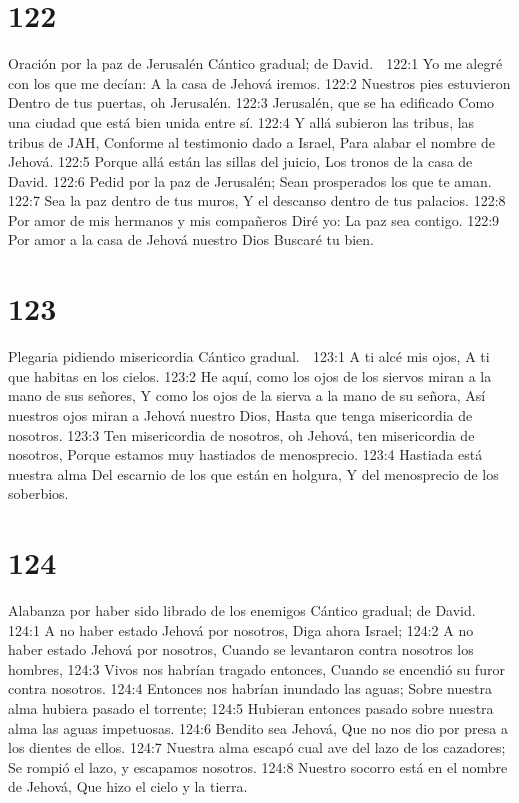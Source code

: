 \chapter{122}

Oración por la paz de Jerusalén 
Cántico gradual; de David. 

122:1 Yo me alegré con los que me decían: 
A la casa de Jehová iremos. 
122:2 Nuestros pies estuvieron 
Dentro de tus puertas, oh Jerusalén. 
122:3 Jerusalén, que se ha edificado 
Como una ciudad que está bien unida entre sí. 
122:4 Y allá subieron las tribus, las tribus de JAH, 
Conforme al testimonio dado a Israel, 
Para alabar el nombre de Jehová. 
122:5 Porque allá están las sillas del juicio, 
Los tronos de la casa de David. 
122:6 Pedid por la paz de Jerusalén; 
Sean prosperados los que te aman. 
122:7 Sea la paz dentro de tus muros, 
Y el descanso dentro de tus palacios. 
122:8 Por amor de mis hermanos y mis compañeros 
Diré yo: La paz sea contigo. 
122:9 Por amor a la casa de Jehová nuestro Dios 
Buscaré tu bien. 

\chapter{123}

Plegaria pidiendo misericordia 
Cántico gradual. 

123:1 A ti alcé mis ojos, 
A ti que habitas en los cielos. 
123:2 He aquí, como los ojos de los siervos miran a la mano de sus señores, 
Y como los ojos de la sierva a la mano de su señora, 
Así nuestros ojos miran a Jehová nuestro Dios, 
Hasta que tenga misericordia de nosotros. 
123:3 Ten misericordia de nosotros, oh Jehová, ten misericordia de nosotros, 
Porque estamos muy hastiados de menosprecio. 
123:4 Hastiada está nuestra alma 
Del escarnio de los que están en holgura, 
Y del menosprecio de los soberbios. 

\chapter{124}

Alabanza por haber sido librado de los enemigos 
Cántico gradual; de David. 

124:1 A no haber estado Jehová por nosotros, 
Diga ahora Israel; 
124:2 A no haber estado Jehová por nosotros, 
Cuando se levantaron contra nosotros los hombres, 
124:3 Vivos nos habrían tragado entonces, 
Cuando se encendió su furor contra nosotros. 
124:4 Entonces nos habrían inundado las aguas; 
Sobre nuestra alma hubiera pasado el torrente; 
124:5 Hubieran entonces pasado sobre nuestra alma las aguas impetuosas. 
124:6 Bendito sea Jehová, 
Que no nos dio por presa a los dientes de ellos. 
124:7 Nuestra alma escapó cual ave del lazo de los cazadores; 
Se rompió el lazo, y escapamos nosotros. 
124:8 Nuestro socorro está en el nombre de Jehová, 
Que hizo el cielo y la tierra. 
  
